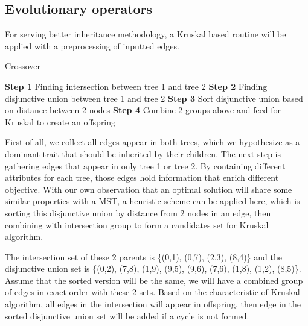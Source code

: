 \subsection{Evolutionary operators}
	For serving better inheritance methodology, a Kruskal based routine will be applied with a preprocessing of inputted edges.

\begin{algorithm}
\caption{Crossover}
\begin{algorithmic}[0]
\State \textbf{Step 1} Finding intersection between tree 1 and tree 2
\State \textbf{Step 2} Finding disjunctive union between tree 1 and tree 2
\State \textbf{Step 3} Sort disjunctive union based on distance between 2 nodes
\State \textbf{Step 4} Combine 2 groups above and feed for Kruskal to create an offspring
\end{algorithmic}
\end{algorithm}

	First of all, we collect all edges appear in both trees, which we hypothesize as a dominant trait that should be inherited by their children. The next step is gathering edges that appear in only tree 1 or tree 2. By containing different attributes for each tree, those edges hold information that enrich different objective. With our own observation that an optimal solution will share some similar properties with a MST, a heuristic scheme can be applied here, which is sorting this disjunctive union by distance from 2 nodes in an edge, then combining with intersection group to form a candidates set for Kruskal algorithm.

\noindent{}

	The intersection set of these 2 parents is \{(0,1), (0,7), (2,3), (8,4)\} and the disjunctive union set is \{(0,2), (7,8), (1,9), (9,5), (9,6), (7,6), (1,8), (1,2), (8,5)\}. Assume that the sorted version will be the same, we will have a combined group of edges in exact order with these 2 sets. Based on the characteristic of Kruskal algorithm, all edges in the intersection will appear in offspring, then edge in the sorted disjunctive union set will be added if a cycle is not formed.


